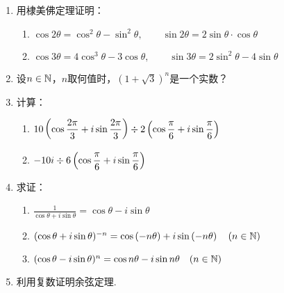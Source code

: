 \begin{enumerate}
\item 用棣美佛定理证明：
\begin{enumerate}[(1)]
    \item $\cos2\theta=\cos^2\theta-\sin^2\theta,\qquad \sin2\theta=2\sin\theta\cdot \cos\theta$
    \item $\cos3\theta=4\cos^3\theta-3\cos\theta,\qquad \sin3\theta=2\sin^2\theta-4\sin\theta$
\end{enumerate}

\item 设$n\in\mathbb{N}$，$n$取何值时，$(1+\sqrt{3})^n$是一个实数？

\item 计算：
\begin{enumerate}[(1)]
    \item $10\left(\cos{\dfrac{2\pi}{3}}+i\sin{\dfrac{2\pi}{3}}\right)\div 2\left(\cos{\dfrac{\pi}{6}}+i\sin{\dfrac{\pi}{6}}\right)$
    \item $-10i\div 6\left(\cos{\dfrac{\pi}{6}}+i\sin{\dfrac{\pi}{6}}\right)$
\end{enumerate}

\item 求证：
\begin{enumerate}[(1)]
    \item $\frac{1}{\cos\theta+i\sin\theta}=\cos\theta-i\sin\theta$
    \item $(\cos{\theta}+i\sin{\theta})^{-n}=\cos\left(-n\theta\right)+i\sin\left(-n\theta\right)\quad (n\in\mathbb{N})$
    \item $(\cos\theta-i\sin\theta)^n=\cos n\theta-i\sin n \theta\quad (n\in\mathbb{N})$
\end{enumerate}

\item 利用复数证明余弦定理.


\end{enumerate}
